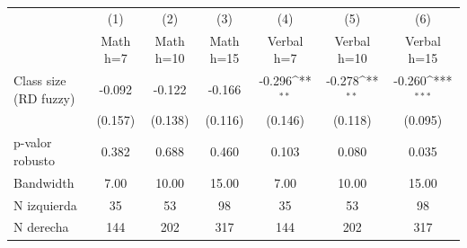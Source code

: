 {
\def\sym#1{\ifmmode^{#1}\else\(^{#1}\)\fi}
\begin{tabular}{l*{6}{c}}
\toprule
            &\multicolumn{1}{c}{(1)}         &\multicolumn{1}{c}{(2)}         &\multicolumn{1}{c}{(3)}         &\multicolumn{1}{c}{(4)}         &\multicolumn{1}{c}{(5)}         &\multicolumn{1}{c}{(6)}         \\
            &\multicolumn{1}{c}{Math h=7}&\multicolumn{1}{c}{Math h=10}&\multicolumn{1}{c}{Math h=15}&\multicolumn{1}{c}{Verbal h=7}&\multicolumn{1}{c}{Verbal h=10}&\multicolumn{1}{c}{Verbal h=15}\\
\midrule
Class size (RD fuzzy)&      -0.092         &      -0.122         &      -0.166         &      -0.296\sym{**} &      -0.278\sym{**} &      -0.260\sym{***}\\
            &     (0.157)         &     (0.138)         &     (0.116)         &     (0.146)         &     (0.118)         &     (0.095)         \\
\midrule
p-valor robusto&       0.382         &       0.688         &       0.460         &       0.103         &       0.080         &       0.035         \\
Bandwidth   &        7.00         &       10.00         &       15.00         &        7.00         &       10.00         &       15.00         \\
N izquierda &          35         &          53         &          98         &          35         &          53         &          98         \\
N derecha   &         144         &         202         &         317         &         144         &         202         &         317         \\
\bottomrule
\end{tabular}
}
